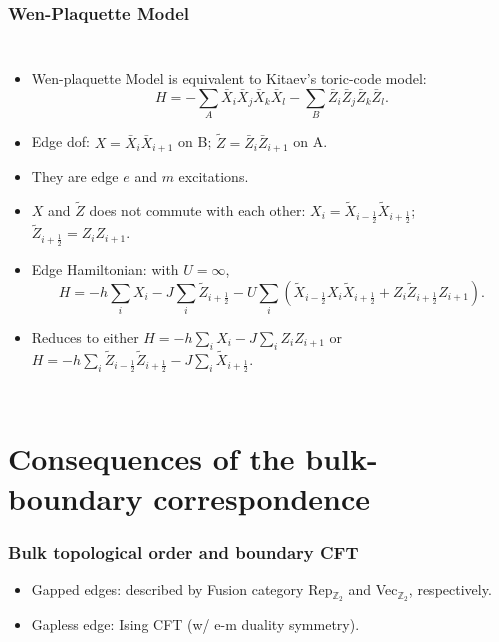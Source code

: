 \documentclass[xcolor=table, 10pt, aspectratio=169]{beamer}
\begin{document}
\begin{frame}
  \frametitle{Wen-Plaquette Model}
  \begin{columns}
    \begin{itemize}
      \item Wen-plaquette Model is equivalent to Kitaev's toric-code model:
      \[H=-\sum_A\bar X_i\bar X_j\bar X_k\bar X_l
      -\sum_B\bar Z_i\bar Z_j\bar Z_k\bar Z_l.\]
      \item Edge dof: $X=\bar X_i\bar X_{i+1}$ on B;
      $\tilde Z=\bar Z_i\bar Z_{i+1}$ on A.
      \item They are edge $e$ and $m$ excitations.
      \item $X$ and $\tilde Z$ does not commute with each other:
      $X_i=\tilde X_{i-\frac12}\tilde X_{i+\frac12}$;
      $\tilde Z_{i+\frac12}=Z_iZ_{i+1}$.
      \item Edge Hamiltonian: with $U=\infty$,
      \[H=-h\sum_iX_i-J\sum_i\tilde Z_{i+\frac12}
      -U\sum_i\left(\tilde X_{i-\frac12}X_i\tilde X_{i+\frac12}
      +Z_i\tilde Z_{i+\frac12}Z_{i+1}\right).\]
      \item Reduces to either
      $H=-h\sum_i X_i-J\sum_i Z_iZ_{i+1}$
      or
      $H=-h\sum_i \tilde Z_{i-\frac12}\tilde Z_{i+\frac12}-J\sum_i\tilde X_{i+\frac12}.$
    \end{itemize}
  \end{columns}
\end{frame}

\section{Consequences of the bulk-boundary correspondence}

\begin{frame}
  \frametitle{Bulk topological order and boundary CFT}
  \begin{center}
  \end{center}
  \begin{itemize}
    \item Gapped edges: described by Fusion category Rep$_{\mathbb Z_2}$ and Vec$_{\mathbb Z_2}$, respectively.
    \item Gapless edge: Ising CFT (w/ e-m duality symmetry).
  \end{itemize}
\end{frame}
\end{document}
